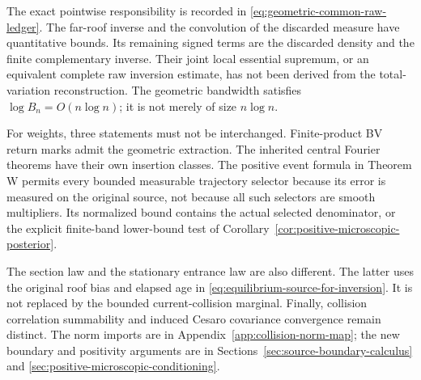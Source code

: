 The exact pointwise responsibility is recorded in
\eqref{eq:geometric-common-raw-ledger}. The far-roof inverse and the
convolution of the discarded measure have quantitative bounds. Its
remaining signed terms are the discarded density and the finite
complementary inverse. Their joint local essential supremum, or an
equivalent complete raw inversion estimate, has not been derived from
the total-variation reconstruction. The geometric bandwidth satisfies
$\log B_n=O(n\log n)$; it is not merely of size $n\log n$.

For weights, three statements must not be interchanged. Finite-product
BV return marks admit the geometric extraction. The inherited central
Fourier theorems have their own insertion classes. The positive event
formula in Theorem W permits every bounded measurable trajectory
selector because its error is measured on the original source, not
because all such selectors are smooth multipliers. Its normalized
bound contains the actual selected denominator, or the explicit
finite-band lower-bound test of
Corollary~\ref{cor:positive-microscopic-posterior}.

The section law and the stationary entrance law are also different.
The latter uses the original roof bias and elapsed age in
\eqref{eq:equilibrium-source-for-inversion}. It is not replaced by the
bounded current-collision marginal. Finally, collision correlation
summability and induced Cesaro covariance convergence remain distinct.
The norm imports are in Appendix~\ref{app:collision-norm-map}; the new
boundary and positivity arguments are in
Sections~\ref{sec:source-boundary-calculus} and
\ref{sec:positive-microscopic-conditioning}.
